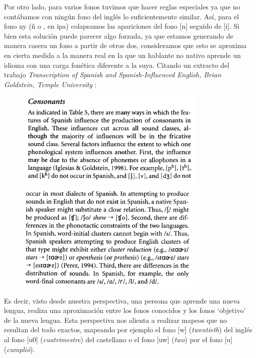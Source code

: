 
Por otro lado, para varios fonos tuvimos que hacer reglas especiales ya que no contábamos con ningún fono del inglés lo suficientemente similar. Así,  para el fono ny (ñ o \textltailn, en ipa) colapsamos las apariciones del fono [n] seguido de [i]. Si bien esta solución puede parecer algo forzada, ya que estamos generando de manera casera un fono a partir de otros dos, consideramos que esto se aproxima en cierta medida a la manera real en la que un hablante no nativo aprende un idioma con una carga fonética diferente a la suya. Citando un extracto del trabajo \textit{Transcription of Spanish and Spanish-Influenced English, Brian Goldstein, Temple University} \cite{spanishInfluencedEnglish}:

\begin{figure}[H]
\centering
\includegraphics[scale=0.6]{imagenes_investigacion/consonantes1.png}
\includegraphics[scale=0.6]{imagenes_investigacion/consonantes2.png}
\end{figure}

Es decir, visto desde nuestra perspectiva, una persona que aprende una nueva lengua, realiza una aproximación entre los fonos conocidos y los fonos `objetivo' de la nueva lengua. Esta perspectiva nos alienta a realizar mapeos que no resultan del todo exactos, mapeando por ejemplo el fono [w] (\textit{twentieth}) del inglés al fono [u0] (\textit{cuatrimestre}) del castellano o el fono [uw] (\textit{two}) por el fono [u] (\textit{cumplió}).

